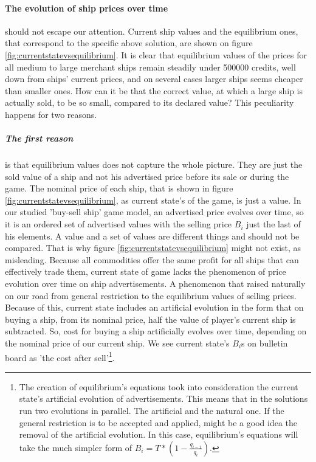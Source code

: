 \documentclass[]{article}
\begin{document}
\paragraph{The evolution of ship prices over time} should not escape our attention. Current ship values and the equilibrium ones, that correspond to the specific above solution, are shown on figure \ref{fig:currentstatevsequilibrium}. It is clear that equilibrium values of the prices for all medium to large merchant ships remain steadily under 500000 credits, well down from ships' current prices, and on several cases larger ships seems cheaper than smaller ones. How can it be that  the correct value, at which a large ship is actually sold, to be so small, compared to its declared value? This peculiarity happens for two reasons.
\subparagraph*{The first reason} is that equilibrium values does not capture the whole picture. They are just the sold value of a ship and not his advertised price before its sale or during the game. The nominal price of each ship, that is shown in figure \ref{fig:currentstatevsequilibrium}, as current state's of the game, is just a value. In our studied 'buy-sell ship' game model, an advertised price evolves over time, so it is an ordered set of advertised values with the selling price $B_{i}$ just the last of his elements. A value and a set of values are different things and should not be compared. That is why figure \ref{fig:currentstatevsequilibrium} might not exist, as misleading. Because all commodities offer the same profit for all ships that can effectively trade them, current state of game lacks the phenomenon of price evolution over time on ship advertisements. A phenomenon that raised naturally on our road from general restriction to the equilibrium values of selling prices. Because of this, current state includes an artificial evolution in the form that on buying a ship, from its nominal price, half the value of player's current ship is subtracted. So, cost for buying a ship artificially  evolves  over time, depending on the nominal price of our current ship. We see current state's $B_{i}$s on bulletin board as 'the cost after sell'\footnote{The creation of equilibrium's equations took into consideration the current state's artificial evolution of advertisements. This means that in the solutions run two evolutions in parallel. The artificial and the natural one. If the general restriction is to be accepted and applied, might be a good idea the removal of the artificial evolution. In this case, equilibrium's equations will take the much simpler form of $B_{i}=T*(1-\tfrac{q_{i-1}}{q_{i}})
$.}. 
\end{document}
